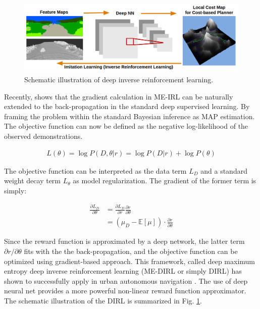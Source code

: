 \documentclass[../thesis.tex]{subfiles}
\begin{document}

\begin{figure}[t]
	\begin{center}
		\centerline{\includegraphics[width=0.9\columnwidth]{./DIRL/fig/dirl_pipeline.png}}
		\caption{Schematic illustration of deep inverse reinforcement learning.}
		\label{fig:dirl_diagram}
	\end{center}
\end{figure} 

Recently, \citet{wulfmeier2015maximum} shows that the gradient calculation in ME-IRL can be naturally extended to the back-propagation in the standard deep supervised learning. By framing the problem within the standard Bayesian inference as MAP estimation. The objective function can now be defined as the negative log-likelihood of the observed demonstrations. 

\begin{align}
L(\theta) = \log P(D,\theta|r) = \log P(D|r) + \log P(\theta) \label{equ:irl_obj}
\end{align}

The objective function can be interpreted as the data term $L_{D}$ and a standard weight decay term $L_{\theta}$ as model regularization. The gradient of the former term is simply:

\begin{align}
\frac{\partial L_D}{\partial \theta} &= \frac{\partial L_D}{\partial r} \frac{\partial r}{\partial \theta} \\
&= (\mu_D - \mathbb{E}[\mu]) \cdot \frac{\partial r}{\partial \theta}
\end{align}

Since the reward function is approximated by a deep network, the latter term $\partial r / \partial \theta$ fits with the the back-propagation, and the objective function can be optimized using gradient-based approach. This framework, called deep maximum entropy deep inverse reinforcement learning (ME-DIRL or simply DIRL) has shown to successfully apply in urban autonomous navigation \cite{wulfmeier2016watch}. The use of deep neural net provides a more powerful non-linear reward function approximator. The schematic illustration of the DIRL is summarized in Fig. \ref{fig:dirl_diagram}.


\end{document}

